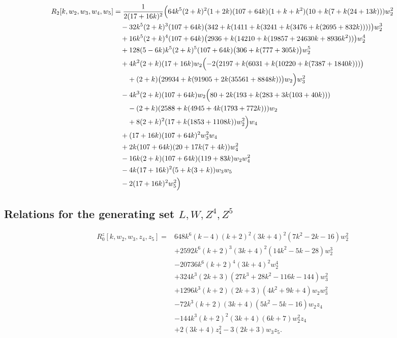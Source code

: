 \documentclass[11 pt]{amsart}
\theoremstyle{definition}
\theoremstyle{plain}
\begin{document}
\begin{align*}
R_2[k, w_2, w_3,w_4, w_5] &= \frac{1}{2 (17 + 16 k)^2} \Bigl(
64 k^5 (2 + k)^2 (1 + 2 k) (107 + 64 k) (1 + k + k^2)
(10 + k (7 + k (24 + 13 k))) w_2^2 \\
&\quad - 32 k^5 (2 + k)^3 (107 + 64 k)
\bigl(342 + k (1411 + k (3241 + k (3476 + k (2695 + 832 k))))\bigr) w_2^3 \\
&\quad + 16 k^5 (2 + k)^4 (107 + 64 k)
\bigl(2936 + k (14210 + k (19857 + 24630 k + 8936 k^2))\bigr) w_2^4 \\
&\quad + 128 (5 - 6 k) k^5 (2 + k)^5 (107 + 64 k)
\bigl(306 + k (777 + 305 k)\bigr) w_2^5 \\
&\quad + 4 k^2 (2 + k) (17 + 16 k) w_2
\Bigl(
-2 \bigl(2197 + k (6031 + k (10220 + k (7387 + 1840 k)))\bigr) \\
&\qquad + (2 + k) \bigl(29934 + k (91905 + 2 k (35561 + 8848 k))\bigr) w_2
\Bigr) w_3^2 \\
&\quad - 4 k^3 (2 + k) (107 + 64 k) w_2
\Bigl(
80 + 2 k (193 + k (283 + 3 k (103 + 40 k))) \\
&\qquad - (2 + k) (2588 + k (4945 + 4 k (1793 + 772 k))) w_2 \\
&\qquad + 8 (2 + k)^2 (17 + k (1853 + 1108 k)) w_2^2
\Bigr) w_4 \\
&\quad + (17 + 16 k) (107 + 64 k)^2 w_3^2 w_4 \\
&\quad + 2 k (107 + 64 k) (20 + 17 k (7 + 4 k)) w_4^2 \\
&\quad - 16 k (2 + k) (107 + 64 k) (119 + 83 k) w_2 w_4^2 \\
&\quad - 4 k (17 + 16 k)^2 (5 + k (3 + k)) w_3 w_5 \\
&\quad - 2 (17 + 16 k)^2 w_5^2
\Bigr)
\end{align*}


\subsection*{Relations for the generating set $L,W,Z^4,Z^5$}

\begin{align*}
R_0^z[k,w_2,w_3,z_4,z_5]={}&
648k^6(k-4)(k+2)^2(3k+4)^2(7k^2-2k-16)w_2^2\\
&+2592k^6(k+2)^3(3k+4)^2(14k^2-5k-28)w_2^3\\
&-20736k^6(k+2)^4(3k+4)^2w_2^4\\
&+324k^3(2k+3)(27k^3+28k^2-116k-144)w_3^2\\
&+1296k^3(k+2)(2k+3)(4k^2+9k+4)w_2 w_3^2\\
&-72k^3(k+2)(3k+4)(5k^2-5k-16)w_2 z_4\\
&-144k^3(k+2)^2(3k+4)(6k+7)w_2^2 z_4\\
&+2(3k+4)z_4^2-3(2k+3)w_3 z_5.
\end{align*}
\end{document}
